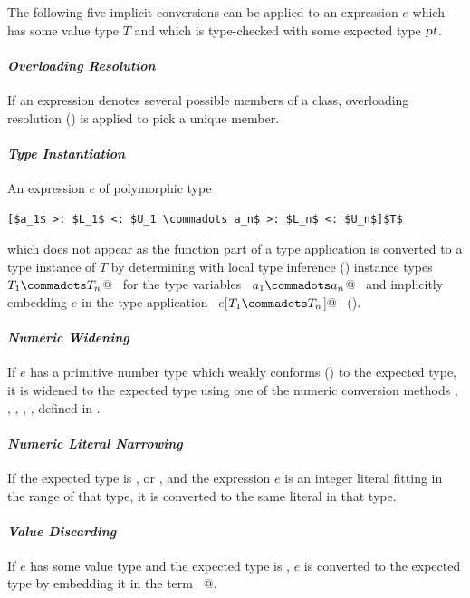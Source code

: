 The following five implicit conversions can be applied to an
expression $e$ which has some value type $T$ and which is type-checked with
some expected type $\mbox{\sl pt}$.

\paragraph{\em Overloading Resolution} 
If an expression denotes several possible members of a class, 
overloading resolution ()
is applied to pick a unique member.

\paragraph{\em Type Instantiation}  
An expression $e$ of polymorphic type
\begin{lstlisting}
[$a_1$ >: $L_1$ <: $U_1 \commadots a_n$ >: $L_n$ <: $U_n$]$T$
\end{lstlisting}
which does not appear as the function part of
a type application is converted to a type instance of $T$
by determining with local type inference
() instance types ~\lstinline@$T_1 \commadots T_n$@~ 
for the type variables ~\lstinline@$a_1 \commadots a_n$@~ and
implicitly embedding $e$ in the type application
~\lstinline@$e$[$T_1 \commadots T_n$]@~ ().

\paragraph{\em Numeric Widening}
If $e$ has a primitive number type which weakly conforms
() to the expected type, it is widened to
the expected type using one of the numeric conversion methods
, , , ,
,  defined in .

\paragraph{\em Numeric Literal Narrowing}
If the expected type is ,  or , and
the expression $e$ is an integer literal fitting in the range of that
type, it is converted to the same literal in that type.

\paragraph{\em Value Discarding}
If $e$ has some value type and the expected type is ,
$e$ is converted to the expected type by embedding it in the 
term ~@.

